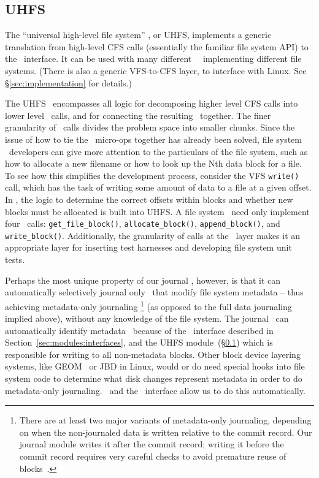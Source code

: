 \subsection{UHFS}
\label{sec:modules:uhfs}

The ``universal high-level file system'' \module, or UHFS, implements a generic
translation from high-level CFS calls (essentially the familiar file system API)
to the \LFS\ interface. It can be used with many different \LFS\ \modules\
implementing different file systems. (There is also a generic VFS-to-CFS layer,
to interface with Linux. See \S\ref{sec:implementation} for details.)

The UHFS \module\ encompasses all logic for decomposing higher level CFS calls
into lower level \LFS\ calls, and for connecting the resulting \patches\
together. The finer granularity of \LFS\ calls divides the problem space into
smaller chunks. Since the issue of how to tie the \LFS\ micro-ops together has
already been solved, file system \module\ developers can give more attention to
the particulars of the file system, such as how to allocate a new filename or
how to look up the Nth data block for a file. To see how this simplifies the
development process, consider the VFS \texttt{write()} call, which has the task
of writing some amount of data to a file at a given offset. In \Kudos, the logic
to determine the correct offsets within blocks and whether new blocks must be
allocated is built into UHFS. A file system \module\ need only implement four
\LFS\ calls: \texttt{get\_file\_block()}, \texttt{allocate\_block()},
\texttt{append\_block()}, and \texttt{write\_block()}. Additionally, the
granularity of calls at the \LFS\ layer makes it an appropriate layer for
inserting test harnesses and developing file system unit tests.


Perhaps the most unique property of our journal \module, however, is that it can
automatically selectively journal only \patches\ that modify file system
metadata -- thus achieving metadata-only journaling \footnote{There are at least
two major variants of metadata-only journaling, depending on when the
non-journaled data is written relative to the commit record. Our journal module
writes it after the commit record; writing it before the commit record requires
very careful checks to avoid premature reuse of blocks~\cite{tweedie00ext3}.}
(as opposed to the full data journaling implied above), without any knowledge of
the file system.
%
The journal \module\ can automatically identify metadata \patches\ because of
the \LFS\ interface described in Section~\ref{sec:modules:interfaces}, and the
UHFS module~(\S\ref{sec:modules:uhfs}) which is responsible for writing to all
non-metadata blocks. Other block device layering systems, like GEOM~\cite{geom}
or JBD in Linux, would or do need special hooks into file system code to
determine what disk changes represent metadata in order to do metadata-only
journaling. \Patches\ and the \LFS\ interface allow us to do this automatically.
